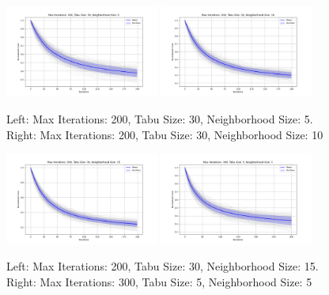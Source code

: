 \documentclass{article}
\begin{document}
    \begin{figure}[H]
        \centering
        \includegraphics[width=0.45\textwidth]{tabu_search/appendix/max_iter_200_tabu_size_30_neighborhood_size_5.png}
        \includegraphics[width=0.45\textwidth]{tabu_search/appendix/max_iter_200_tabu_size_30_neighborhood_size_10.png}
        \caption{Left: Max Iterations: 200, Tabu Size: 30, Neighborhood Size: 5. Right: Max Iterations: 200, Tabu Size: 30, Neighborhood Size: 10}
        \label{fig:ts_200_30_5_30_10}
    \end{figure}

    \begin{figure}[H]
        \centering
        \includegraphics[width=0.45\textwidth]{tabu_search/appendix/max_iter_200_tabu_size_30_neighborhood_size_15.png}
        \includegraphics[width=0.45\textwidth]{tabu_search/appendix/max_iter_300_tabu_size_5_neighborhood_size_5.png}
        \caption{Left: Max Iterations: 200, Tabu Size: 30, Neighborhood Size: 15. Right: Max Iterations: 300, Tabu Size: 5, Neighborhood Size: 5}
        \label{fig:ts_200_30_15_300_5_5}
    \end{figure}
\end{document}
